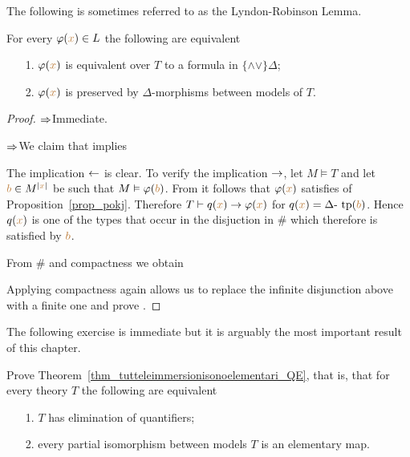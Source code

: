 The following is sometimes referred to as the Lyndon-Robinson Lemma.

\begin{lemma}\label{lem_qfdefinability}
For every $\varphi({\color{brown} x})\in L$ the following are equivalent
\begin{itemize}
\item[1.] $\varphi({\color{brown} x})$ is equivalent over $T$ to a formula in $\{\mathord\wedge\mathord\vee\}\Delta$;
\item[2.] $\varphi({\color{brown} x})$ is preserved by $\Delta$-morphisms between models of $T$.
\end{itemize}
\end{lemma}
\begin{proof} $\Rightarrow$\quad Immediate.

$\Rightarrow$\quad  We claim that  implies


The implication $\leftarrow$ is clear.
To verify the implication $\rightarrow$, let $M\models T$ and let ${\color{brown} b}\in M^{|{\color{brown} x}|}$ be such that $M\vDash\varphi({\color{brown} b})$.
From  it follows that $\varphi({\color{brown} x})$ satisfies  of Proposition~\ref{prop_pokj}.
Therefore $T\vdash q({\color{brown} x})\rightarrow\varphi({\color{brown} x})$ for $q({\color{brown} x})=\Delta\mbox{\rm - tp}({\color{brown} b})$.
Hence $q({\color{brown} x})$ is one of the types that occur in the disjuction in $\#$ which therefore is satisfied by ${\color{brown} b}$.

From $\#$ and compactness we obtain


Applying compactness again allows us to replace the infinite disjunction above with a finite one and prove .
\end{proof}

The following exercise is immediate but it is arguably the most important result of this chapter. 

\begin{exercise}\label{ex_prove_thm_EQ}
Prove Theorem~\ref{thm_tutteleimmersionisonoelementari_QE}, that is, that for every theory $T$ the following are equivalent
\begin{itemize}
\item[1.] $T$ has elimination of quantifiers;
\item[2.] every partial isomorphism between models $T$ is an elementary map.\QED
\end{itemize}
\end{exercise}

